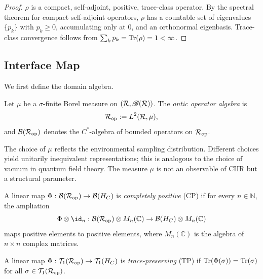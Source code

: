 \begin{proof}
$\rho$ is a compact, self-adjoint, positive, trace-class operator.  By the
spectral theorem for compact self-adjoint operators, $\rho$ has a countable
set of eigenvalues $\{p_k\}$ with $p_k \geq 0$, accumulating only at $0$,
and an orthonormal eigenbasis.  Trace-class convergence follows from
$\sum_k p_k = \mathrm{Tr}(\rho) = 1 < \infty$.
\end{proof}

\subsection{Interface Map}
\label{sec:ch3:interface}

We first define the domain algebra.

\begin{definition}
\label{def:3.15}
Let $\mu$ be a $\sigma$-finite Borel measure on $(\mathcal{R}, \mathscr{B}(\mathcal{R}))$.
The \emph{ontic operator algebra} is
\[
  \mathcal{R}_{\mathrm{op}} := L^2(\mathcal{R}, \mu),
\]
and $\mathcal{B}(\mathcal{R}_{\mathrm{op}})$ denotes the $C^*$-algebra of bounded
operators on $\mathcal{R}_{\mathrm{op}}$.
\end{definition}

\begin{remark}
\label{rem:3.2}
The choice of $\mu$ reflects the environmental sampling distribution.
Different choices yield unitarily inequivalent representations; this is
analogous to the choice of vacuum in quantum field theory.  The measure
$\mu$ is not an observable of CIIR but a structural parameter.
\end{remark}

\begin{definition}
\label{def:3.16}
A linear map $\Phi : \mathcal{B}(\mathcal{R}_{\mathrm{op}}) \to \mathcal{B}(H_C)$ is
\emph{completely positive} (CP) if for every $n \in \mathbb{N}$, the
ampliation
\[
  \Phi \otimes \id_n : \CB(\CR_{\mathrm{op}}) \otimes M_n(\mathbb{C})
    \to \CB(\HC) \otimes M_n(\mathbb{C})
\]
maps positive elements to positive elements, where $M_n(\mathbb{C})$ is
the algebra of $n \times n$ complex matrices.
\end{definition}

\begin{definition}
\label{def:3.17}
A linear map $\Phi : \mathcal{T}_1(\mathcal{R}_{\mathrm{op}}) \to
\mathcal{T}_1(H_C)$ is \emph{trace-preserving} (TP) if
$\mathrm{Tr}(\Phi(\sigma)) = \mathrm{Tr}(\sigma)$ for all
$\sigma \in \mathcal{T}_1(\mathcal{R}_{\mathrm{op}})$.
\end{definition}

